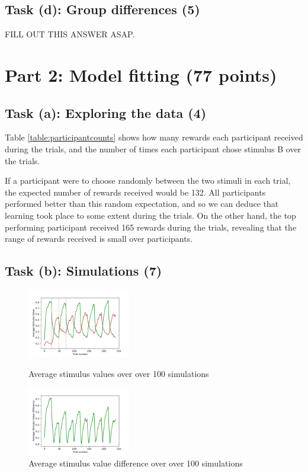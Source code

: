 \documentclass{article}
\begin{document}
\subsection{Task (d): Group differences (5)}

FILL OUT THIS ANSWER ASAP.

\section{Part 2: Model fitting (77 points)}

\subsection{Task (a): Exploring the data (4)}

Table \ref{table:participantcounts} shows how many rewards each participant received during the trials, and the number of times each participant chose stimulus B over the trials.

If a participant were to choose randomly between the two stimuli in each trial, the expected number of rewards received would be 132. All participants performed better than this random expectation, and so we can deduce that learning took place to some extent during the trials. On the other hand, the top performing participant received 165 rewards during the trials, revealing that the range of rewards received is small over participants.

\subsection{Task (b): Simulations (7)}

\begin{figure}[H]
  \centering
  \includegraphics[width=0.4\textwidth]{figures/part2/task2/average_stimulus_values.pdf}
  \caption{Average stimulus values over over 100 simulations}
  \label{fig:averagestimulusvalues}
  \includegraphics[width=0.4\textwidth]{figures/part2/task2/average_stimulus_value_difference.pdf}
  \caption{Average stimulus value difference over over 100 simulations}
  \label{fig:averagestimulusvaluedifference}
\end{figure}
\end{document}
